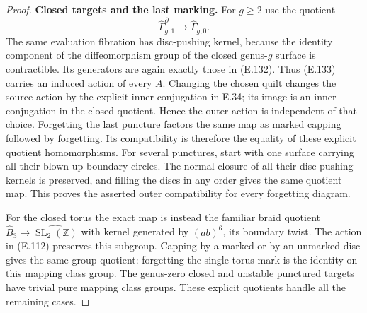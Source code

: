 \begin{proof}
\medskip\noindent\textbf{Closed targets and the last marking.}
For $g\geq2$ use the quotient
\[
 \widehat\Gamma_{g,1}^{\partial}
       \longrightarrow\widehat\Gamma_{g,0}.             \tag{E.133}
\]
The same evaluation fibration
has disc-pushing kernel, because
the identity component of the
diffeomorphism group of the
closed genus-$g$ surface is
contractible.  Its generators
are again exactly those in
(E.132).  Thus (E.133) carries
an induced action of every
$A$.  Changing the chosen
quilt changes the source action
by the explicit inner
conjugation in E.34; its image
is an inner conjugation in the
closed quotient.  Hence the
outer action is independent of
that choice.
Forgetting the last puncture
factors the same map as marked
capping followed by forgetting.
Its compatibility is therefore
the equality of these explicit
quotient homomorphisms.
For several punctures, start
with one surface carrying all
their blown-up boundary circles.
The normal closure of all their
disc-pushing kernels is
preserved, and filling the
discs in any order gives the
same quotient map.  This
proves the asserted outer
compatibility for every
forgetting diagram.

For the closed torus the
exact map is instead the
familiar braid quotient
$\widehat B_3\to
\widehat{\operatorname{SL}_2(\mathbb Z)}$
with kernel generated by
$(ab)^6$, its boundary twist.
The action in (E.112)
preserves this subgroup.
Capping by a marked or by an
unmarked disc gives the same
group quotient: forgetting
the single torus mark is the
identity on this mapping class
group.  The genus-zero closed
and unstable punctured targets
have trivial pure mapping
class groups.  These explicit
quotients handle all the
remaining cases.
\end{proof}

